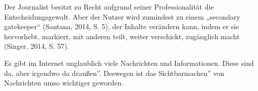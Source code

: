 Der Journalist besitzt zu Recht aufgrund seiner Professionalität die
Entscheidungsgewalt. Aber der Nutzer wird zumindest zu einem „secondary
gatekeeper“ (Santana, 2014, S. 5), der Inhalte verändern kann, indem er sie
hervorhebt, markiert, mit anderen teilt, weiter verschickt, zugänglich macht
(Singer, 2014, S. 57).

Es gibt im Internet unglaublich viele Nachrichten und Informationen. Diese sind
da, aber irgendwo \glqq da draußen''. Deswegen ist das \glqq Sichtbarmachen''
von Nachrichten umso wichtiger geworden.



